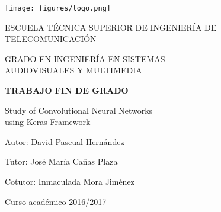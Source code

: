 \begin{titlepage}
	
	\begin{center}
		\vspace*{7.7mm}
		\begin{center}
			\texttt{[image: figures/logo.png]}
		\end{center}
		\vspace{6.5mm}
		
		\fontsize{15.5}{14}\selectfont ESCUELA TÉCNICA SUPERIOR DE INGENIERÍA DE TELECOMUNICACIÓN
		\vspace{13mm}
		
		\fontsize{14}{14}\selectfont GRADO EN INGENIERÍA EN SISTEMAS \\ AUDIOVISUALES Y MULTIMEDIA

		\vspace{70pt}
		
		\fontsize{15.7}{14}\selectfont \textbf{TRABAJO FIN DE GRADO} 
		
		\vspace{25mm}
		\begin{huge}
			 Study of Convolutional Neural Networks\\ using Keras Framework
		\end{huge}
		
		\vspace{25mm}
		
		\begin{large}
			Autor: David Pascual Hernández
			
			Tutor: José María Cañas Plaza
			
			Cotutor: Inmaculada Mora Jiménez 
			
			\vspace{10mm}
		\end{large}
		\begin{normalsize}
			Curso académico 2016/2017		
		\end{normalsize}
		\vspace{10mm}
		
	\end{center}
	
\end{titlepage}

\pagebreak
\thispagestyle{empty}
\vspace*{12cm}

